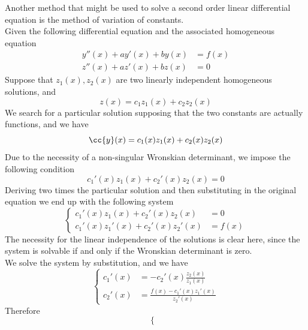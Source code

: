 \documentclass[../mmf.tex]{subfiles}
\begin{document}
\begin{mtd}
	Another method that might be used to solve a second order linear differential equation is the method of variation of constants.\\
	Given the following differential equation and the associated homogeneous equation
	\begin{equation*}
		\begin{aligned}
			y''(x)+ay'(x)+by(x)&=f(x)\\
			z''(x)+az'(x)+bz(x)&=0
		\end{aligned}
	\end{equation*}
	Suppose that $z_1(x),z_2(x)$ are two linearly independent homogeneous solutions, and
	\begin{equation*}
		z(x)=c_1z_1(x)+c_2z_2(x)
	\end{equation*}
	We search for a particular solution supposing that the two constants are actually functions, and we have
	\begin{equation*}
		\cc{y}(x)=c_1(x)z_1(x)+c_2(x)z_2(x)
	\end{equation*}
	Due to the necessity of a non-singular Wronskian determinant, we impose the following condition
	\begin{equation*}
		c_1'(x)z_1(x)+c_2'(x)z_2(x)=0
	\end{equation*}
	Deriving two times the particular solution and then substituting in the original equation we end up with the following system
	\begin{equation*}
		\left\{\begin{aligned}
			c_1'(x)z_1(x)+c_2'(x)z_2(x)&=0\\
			c_1'(x)z_1'(x)+c_2'(x)z_2'(x)&=f(x)
		\end{aligned}\right.
	\end{equation*}
	The necessity for the linear independence of the solutions is clear here, since the system is solvable if and only if the Wronskian determinant is zero.\\
	We solve the system by substitution, and we have
	\begin{equation*}
		\left\{ \begin{aligned}
				c_1'(x)&=-c_2'(x)\frac{z_2(x)}{z_1(x)}\\
				c_2'(x)&=\frac{f(x)-c_1'(x)z_1'(x)}{z_2'(x)}
		\end{aligned}\right.
	\end{equation*}
	Therefore
	\begin{equation*}
		\left\{ \begin{aligned}

\end{aligned}
\end{equation*}
\end{mtd}
\end{document}
